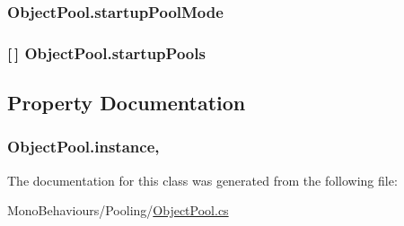 \subsubsection[{\texorpdfstring{startup\+Pool\+Mode}{startupPoolMode}}]{ Object\+Pool.\+startup\+Pool\+Mode}\hypertarget{class_object_pool_abfc2e120220d5a26728410df1298ecb3}{}\label{class_object_pool_abfc2e120220d5a26728410df1298ecb3}
\subsubsection[{\texorpdfstring{startup\+Pools}{startupPools}}]{ \mbox{[}$\,$\mbox{]} Object\+Pool.\+startup\+Pools}\hypertarget{class_object_pool_a6389859576fb2d968ceed034d8be7654}{}\label{class_object_pool_a6389859576fb2d968ceed034d8be7654}


\subsection{Property Documentation}
\subsubsection[{\texorpdfstring{instance}{instance}}]{ Object\+Pool.\+instance\hspace{0.3cm}{\ttfamily [static]}, {\ttfamily [get]}}\hypertarget{class_object_pool_ab67914e0f6e4521ae324566a3e06e927}{}\label{class_object_pool_ab67914e0f6e4521ae324566a3e06e927}


The documentation for this class was generated from the following file\+:\begin{DoxyCompactItemize}
\item 
Mono\+Behaviours/\+Pooling/\hyperlink{_object_pool_8cs}{Object\+Pool.\+cs}\end{DoxyCompactItemize}

